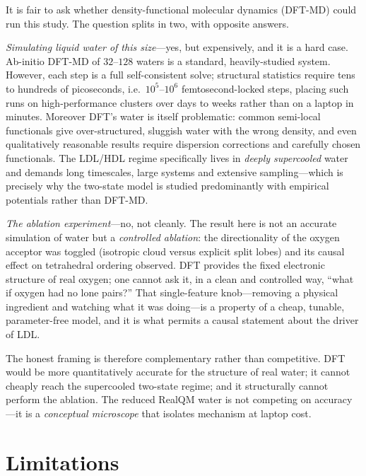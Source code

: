 \documentclass[11pt]{article}
\begin{document}
It is fair to ask whether density-functional molecular dynamics (DFT-MD) could run this
study. The question splits in two, with opposite answers.

\emph{Simulating liquid water of this size}---yes, but expensively, and it is a hard case.
Ab-initio DFT-MD of $32$--$128$ waters is a standard, heavily-studied system. However, each
step is a full self-consistent solve; structural statistics require tens to hundreds of
picoseconds, i.e.\ $10^5$--$10^6$ femtosecond-locked steps, placing such runs on
high-performance clusters over days to weeks rather than on a laptop in minutes. Moreover
DFT's water is itself problematic: common semi-local functionals give over-structured,
sluggish water with the wrong density, and even qualitatively reasonable results require
dispersion corrections and carefully chosen functionals. The LDL/HDL regime specifically
lives in \emph{deeply supercooled} water and demands long timescales, large systems and
extensive sampling---which is precisely why the two-state model is studied predominantly
with empirical potentials rather than DFT-MD.

\emph{The ablation experiment}---no, not cleanly. The result here is not an accurate
simulation of water but a \emph{controlled ablation}: the directionality of the oxygen
acceptor was toggled (isotropic cloud versus explicit split lobes) and its causal effect on
tetrahedral ordering observed. DFT provides the fixed electronic structure of real oxygen;
one cannot ask it, in a clean and controlled way, ``what if oxygen had no lone pairs?'' That
single-feature knob---removing a physical ingredient and watching what it was doing---is a
property of a cheap, tunable, parameter-free model, and it is what permits a causal statement
about the driver of LDL.

The honest framing is therefore complementary rather than competitive. DFT would be more
quantitatively accurate for the structure of real water; it cannot cheaply reach the
supercooled two-state regime; and it structurally cannot perform the ablation. The reduced
RealQM water is not competing on accuracy---it is a \emph{conceptual microscope} that
isolates mechanism at laptop cost.

\section{Limitations}
\end{document}
